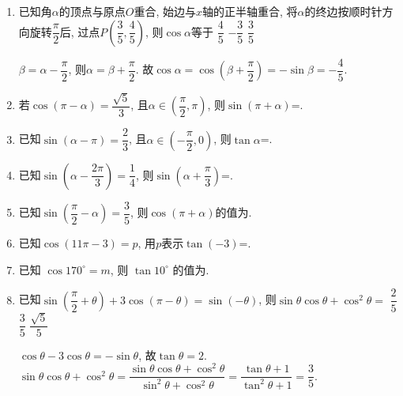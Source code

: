 \begin{enumerate}
    \item 已知角$\alpha$的顶点与原点$O$重合, 始边与$x$轴的正半轴重合, 将$\alpha$的终边按顺时针方向旋转$\dfrac{\pi}{2}$后, 
    过点$P\left(\dfrac{3}{5},\dfrac{4}{5}\right)$, 则$\cos\alpha$等于
    {$\dfrac{4}{5}$}
    {$-\dfrac{3}{5}$}
    {$\dfrac{3}{5}$}
    \begin{jieda}
    $\beta=\alpha-\dfrac{\pi}{2}$, 则$\alpha=\beta+\dfrac{\pi}{2}$. 
    故$\cos\alpha=\cos\left(\beta+\dfrac{\pi}{2}\right)=-\sin\beta=-\dfrac{4}{5}$. 
    \end{jieda}
    
    \item 若$\cos\left(\pi-\alpha\right)=\dfrac{\sqrt5}{3}$, 且$\alpha\in\left(\dfrac{\pi}{2},\pi\right)$, 则$\sin\left(\pi+\alpha\right)$=. 

    \item 已知$\sin\left(\alpha-\pi\right)=\dfrac{2}{3}$, 且$\alpha\in\left(-\dfrac{\pi}{2},0\right)$, 则$\tan\alpha$=. 
    
    \item 已知$\sin\left(\alpha-\dfrac{2\pi}{3}\right)=\dfrac{1}{4}$, 则$\sin\left(\alpha+\dfrac{\pi}{3}\right)$=. 

    \item 已知$\sin\left(\dfrac{\pi}{2}-\alpha\right)=\dfrac{3}{5}$, 则$\cos\left(\pi+\alpha\right)$的值为. 

    \item 已知$\cos\left(11\pi-3\right)=p$, 用$p$表示$\tan\left(-3\right)$=.  

    \item 已知 $\cos 170^{\circ}=m$, 则 $\tan 10^{\circ}$ 的值为.

    \item 已知$\sin\left(\dfrac{\pi}{2}+\theta\right)+3\cos\left(\pi-\theta\right)=\sin\left(-\theta\right)$, 则$\sin\theta\cos\theta+\cos^2\theta=$
    {$\dfrac{2}{5}$}
    {$\dfrac{3}{5}$}
    {$\dfrac{\sqrt5}{5}$}
    \begin{jieda}
    $\cos\theta-3\cos\theta=-\sin\theta$, 故$\tan\theta=2$. \\
    $\sin\theta\cos\theta+\cos^2\theta=\dfrac{\sin\theta\cos\theta+\cos^2\theta}{\sin^2\theta+\cos^2\theta}=\dfrac{\tan\theta+1}{\tan^2\theta+1}=\dfrac{3}{5}$. 
    \end{jieda}


\end{enumerate}
